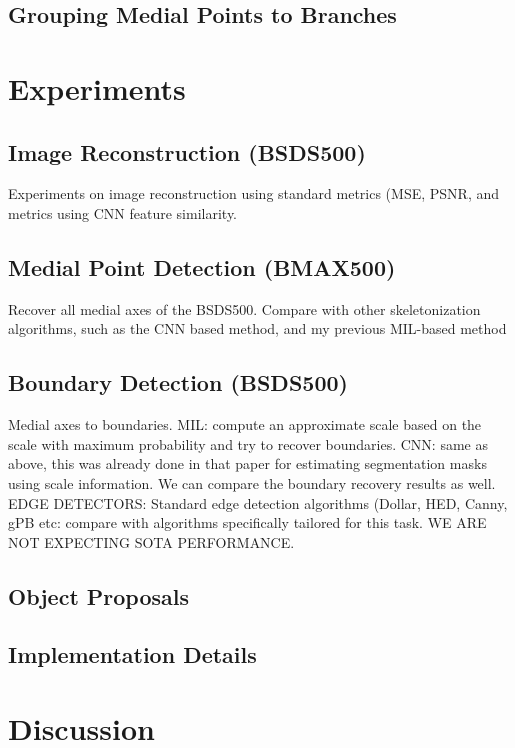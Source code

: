 \documentclass[10pt,twocolumn,letterpaper]{article}
\begin{document}
\subsection{Grouping Medial Points to Branches}\label{sec:grouping}

\section{Experiments}\label{sec:experiments}
\subsection{Image Reconstruction (BSDS500)}
Experiments on image reconstruction using standard metrics (MSE, PSNR, and metrics using CNN feature similarity.

\subsection{Medial Point Detection (BMAX500)}\label{sec:medial-point-detection}
Recover all medial axes of the BSDS500. Compare with other skeletonization algorithms, such
as the CNN based method, and my previous MIL-based method

\subsection{Boundary Detection (BSDS500)}\label{sec:boundary-detection}
Medial axes to boundaries. 
MIL: compute an approximate scale based on the scale with maximum probability and try to recover boundaries.
CNN: same as above, this was already done in that paper for estimating segmentation masks using scale information.
We can compare the boundary recovery results as well.
EDGE DETECTORS: Standard edge detection algorithms (Dollar, HED, Canny, gPB etc: compare with algorithms specifically
tailored for this task. WE ARE NOT EXPECTING SOTA PERFORMANCE.

\subsection{Object Proposals}\label{sec:object-proposals}

\subsection{Implementation Details}

\section{Discussion}\label{sec:discussion}

{\small


}
\end{document}
